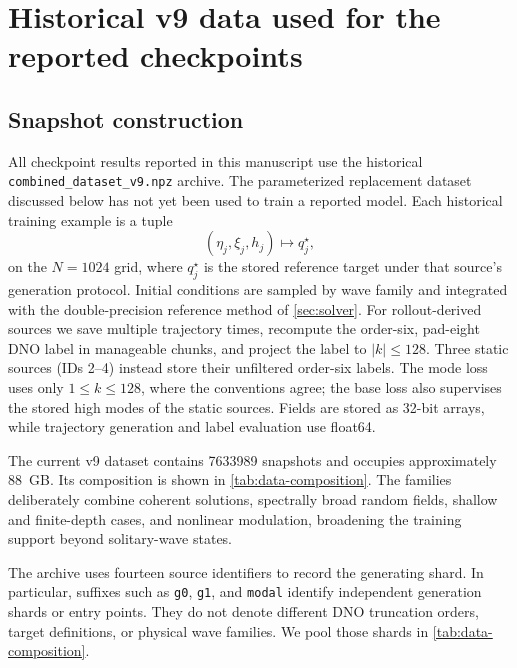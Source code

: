 \section{Historical v9 data used for the reported checkpoints}
\label{sec:data}

\subsection{Snapshot construction}

All checkpoint results reported in this manuscript use the historical
\texttt{combined\_dataset\_v9.npz} archive.  The parameterized replacement
dataset discussed below has not yet been used to train a reported model.
Each historical training example is a tuple
\begin{equation}
  (\eta_j,\xi_j,h_j)\longmapsto q_j^\star,
  \label{eq:data-map}
\end{equation}
on the $N=1024$ grid, where $q_j^\star$ is the stored reference target under
that source's generation protocol.  Initial conditions are sampled by wave
family and integrated with the double-precision reference method of
\cref{sec:solver}.  For rollout-derived sources we save multiple trajectory
times, recompute the order-six, pad-eight DNO label in manageable chunks, and
project the label to $|k|\leq128$.  Three static sources (IDs 2--4) instead
store their unfiltered order-six labels.  The mode loss uses only
$1\leq k\leq128$, where the conventions agree; the base loss also supervises
the stored high modes of the static sources.  Fields are stored as 32-bit
arrays, while trajectory generation and label evaluation use float64.

The current v9 dataset contains \num{7633989} snapshots and occupies
approximately \SI{88}{GB}.  Its composition is shown in
\cref{tab:data-composition}.  The families deliberately combine coherent
solutions, spectrally broad random fields, shallow and finite-depth cases, and
nonlinear modulation, broadening the training support beyond solitary-wave
states.

The archive uses fourteen source identifiers to record the generating shard.
In particular, suffixes such as \texttt{g0}, \texttt{g1}, and
\texttt{modal} identify independent generation shards or entry points.  They
do not denote different DNO truncation orders, target definitions, or physical
wave families.  We pool those shards in \cref{tab:data-composition}.

